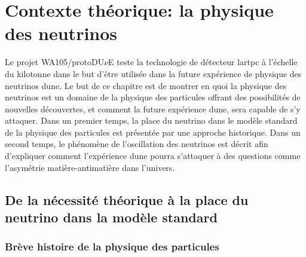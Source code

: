 \chapter{Contexte théorique: la physique des neutrinos}
    
    Le projet WA105/protoDU$\nu$E teste la technologie de détecteur \gls{lartpc} à l'échelle du kilotonne dans le but d'être utilisée dans la future expérience de physique des neutrinos \gls{dune}. Le but de ce chapitre est de montrer en quoi la physique des neutrinos est un domaine de la physique des particules offrant des possibilités de nouvelles découvertes, et comment la future expérience \gls{dune}, sera capable de s'y attaquer. Dans un premier temps, la place du neutrino dans le modèle standard de la physique des particules est présentée par une approche historique. Dans un second temps, le phénomène de l'oscillation des neutrinos est décrit afin d'expliquer comment l'expérience \gls{dune} pourra s'attaquer à des questions comme l'asymétrie matière-antimatière dans l'univers.
    
    \section{De la nécessité théorique à la place du neutrino dans la modèle standard}
    
	    \subsection{Brève histoire de la physique des particules}
	    
